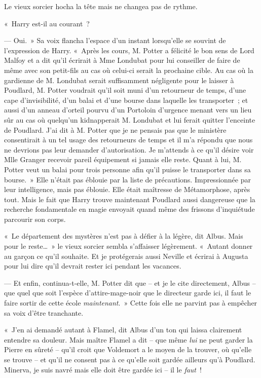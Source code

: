 Le vieux sorcier hocha la tête mais ne changea pas de rythme.

«~Harry est-il au courant~?

--- Oui.~»
Sa voix flancha l'espace d'un instant lorsqu'elle se souvint de l'expression de Harry.
«~Après les cours, M. Potter a félicité le bon sens de Lord Malfoy et a dit qu'il écrirait à Mme Londubat pour lui conseiller de faire de même avec son petit-fils au cas où celui-ci serait la prochaine cible.
Au cas où la gardienne de M. Londubat serait suffisamment négligente pour le laisser à Poudlard, M. Potter voudrait qu'il soit muni d'un retourneur de temps, d'une cape d'invisibilité, d'un balai et d'une bourse dans laquelle les transporter~; et aussi d'un anneau d'orteil pourvu d'un Portoloin d'urgence menant vers un lieu sûr au cas où quelqu'un kidnapperait M. Londubat et lui ferait quitter l'enceinte de Poudlard.
J'ai dit à M. Potter que je ne pensais pas que le ministère consentirait à un tel usage des retourneurs de temps et il m'a répondu que nous ne devrions pas leur demander d'autorisation.
Je m'attends à ce qu'il désire voir Mlle Granger recevoir pareil équipement si jamais elle reste.
Quant à lui, M. Potter veut un balai pour trois personne afin qu'il puisse le transporter dans sa bourse.~»
Elle n'était pas éblouie par la liste de précautions.
Impressionnée par leur intelligence, mais pas éblouie.
Elle était maîtresse de Métamorphose, après tout.
Mais le fait que Harry trouve maintenant Poudlard aussi dangereuse que la recherche fondamentale en magie envoyait quand même des frissons d'inquiétude parcourir son corps.

«~Le département des mystères n'est pas à défier à la légère, dit Albus.
Mais pour le reste…~»
le vieux sorcier sembla s'affaisser légèrement.
«~Autant donner au garçon ce qu'il souhaite.
Et je protégerais aussi Neville et écrirai à Augusta pour lui dire qu'il devrait rester ici pendant les vacances.

--- Et enfin, continua-t-elle, M. Potter dit que -- et je le cite directement, Albus -- que quel que soit l'espèce d'attire-mage-noir que le directeur garde ici, il faut le faire sortir de cette école \emph{maintenant}.~»
Cette fois elle ne parvint pas à empêcher sa voix d'être tranchante.

«~J'en ai demandé autant à Flamel, dit Albus d'un ton qui laissa clairement entendre sa douleur.
Mais maître Flamel a dit -- que même \emph{lui} ne peut garder la Pierre en sûreté -- qu'il croit que Voldemort a le moyen de la trouver, où qu'elle se trouve -- et qu'il ne consent pas à ce qu'elle soit gardée ailleurs qu'à Poudlard.
Minerva, je suis navré mais elle doit être gardée ici -- il le \emph{faut}~!

